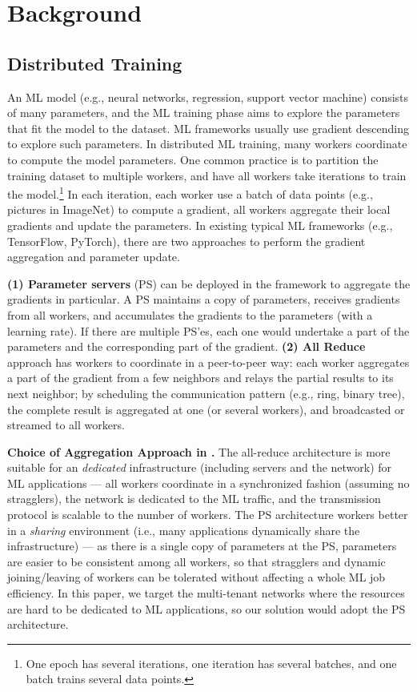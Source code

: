 \section{Background}
\subsection{Distributed Training}
An ML model (e.g., neural networks, regression, support vector machine) 
consists of many parameters, and the ML training phase aims to explore the 
parameters that fit the model to the dataset. ML frameworks usually use 
gradient descending to explore such parameters.
In distributed ML training, many workers coordinate to compute the model parameters. 
One common practice is to partition the training dataset to multiple workers,
and have all workers take iterations to train the model.\footnote{One epoch has several iterations,
one iteration has several batches, and one batch trains several data points.}
In each iteration, each worker use a batch of data points (e.g., pictures in ImageNet)
to compute a gradient, all workers aggregate their local gradients and update the parameters.
In existing typical ML frameworks (e.g., TensorFlow, PyTorch),
there are two approaches to perform the gradient aggregation and parameter update.

\textbf{(1) Parameter servers} (PS) can be deployed in the framework to aggregate the gradients 
in particular. A PS maintains a copy of parameters, receives gradients from all workers, and accumulates the gradients to the parameters (with a learning rate). If there are multiple PS'es,
each one would undertake a part of the parameters and the corresponding part of the gradient.
\textbf{(2) All Reduce} approach has workers to coordinate in a peer-to-peer way: each worker 
aggregates a part of the gradient from a few neighbors and relays the partial results to its next neighbor;
by scheduling the communication pattern (e.g., ring, binary tree), the complete result
is aggregated at one (or several workers), and broadcasted or streamed to all workers.




\textbf{Choice of Aggregation Approach in \sysname.} The all-reduce architecture is more suitable for 
an \emph{dedicated} infrastructure (including servers and the network) for ML applications ---
all workers coordinate in a synchronized fashion (assuming no stragglers), the
network is dedicated to the ML traffic, and the transmission protocol is scalable to the
number of workers. The PS architecture workers better in a \emph{sharing} environment
(i.e., many applications dynamically share the infrastructure) --- 
as there is a single copy of parameters at the PS, parameters are easier to be consistent
among all workers, so that stragglers and dynamic joining/leaving of workers can be tolerated
without affecting a whole ML job efficiency. In this paper, we target the multi-tenant networks
where the resources are hard to be dedicated to ML applications, so our solution would 
adopt the PS architecture.
 

